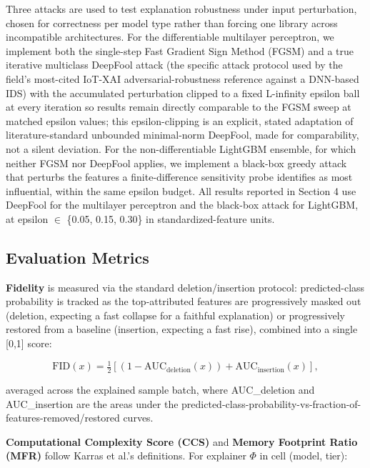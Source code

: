 Three attacks are used to test explanation robustness under input perturbation, chosen for correctness per model type rather than forcing one library across incompatible architectures. For the differentiable multilayer perceptron, we implement both the single-step Fast Gradient Sign Method (FGSM) and a true iterative multiclass DeepFool attack \citep{ref25} (the specific attack protocol used by the field's most-cited IoT-XAI adversarial-robustness reference \citep{ref8} against a DNN-based IDS) with the accumulated perturbation clipped to a fixed L-infinity epsilon ball at every iteration so results remain directly comparable to the FGSM sweep at matched epsilon values; this epsilon-clipping is an explicit, stated adaptation of literature-standard unbounded minimal-norm DeepFool, made for comparability, not a silent deviation. For the non-differentiable LightGBM ensemble, for which neither FGSM nor DeepFool applies, we implement a black-box greedy attack that perturbs the features a finite-difference sensitivity probe identifies as most influential, within the same epsilon budget. All results reported in Section 4 use DeepFool for the multilayer perceptron and the black-box attack for LightGBM, at epsilon $\in$ \{0.05, 0.15, 0.30\} in standardized-feature units.

\subsection{Evaluation Metrics}\label{evaluation-metrics}

\textbf{Fidelity} is measured via the standard deletion/insertion protocol: predicted-class probability is tracked as the top-attributed features are progressively masked out (deletion, expecting a fast collapse for a faithful explanation) or progressively restored from a baseline (insertion, expecting a fast rise), combined into a single {[}0,1{]} score:

\begin{equation}\mathrm{FID}(x) = \tfrac{1}{2} \left[ (1 - \mathrm{AUC}_{\mathrm{deletion}}(x)) + \mathrm{AUC}_{\mathrm{insertion}}(x) \right],\end{equation}

averaged across the explained sample batch, where AUC\_deletion and AUC\_insertion are the areas under the predicted-class-probability-vs-fraction-of-features-removed/restored curves.

\textbf{Computational Complexity Score (CCS)} and \textbf{Memory Footprint Ratio (MFR)} follow Karras et al.'s \citep{ref1} definitions. For explainer $\Phi$ in cell (model, tier):

